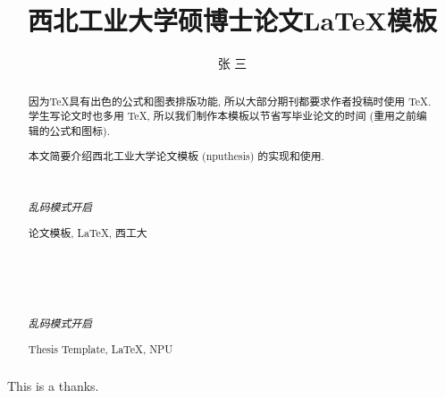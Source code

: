 \documentclass[twoside,UTF8,phd]{nputhesis}
\title[\LaTeX\ Template for Thesis of NPU]{西北工业大学硕博士论文\LaTeX 模板}
\author[San Zhang]{张\,\,三}
\theoremstyle{plain}
\begin{document}
\makecover  %
\frontmatter

\begin{abstract}  
    因为\TeX 具有出色的公式和图表排版功能, 所以大部分期刊都要求作者投稿时使用
    \TeX. 学生写论文时也多用 \TeX, 所以我们制作本模板以节省写毕业论文的时间 
    (重用之前编辑的公式和图标).

    本文简要介绍西北工业大学论文模板 (nputhesis) 的实现和使用.

    { %
        \noindent\hrulefill\\
        {\centerline {\it 乱码模式开启}}
        \noindent\hrulefill
    }
    \begin{keywords}
        论文模板, \LaTeX, 西工大 
    \end{keywords}
\end{abstract}

\begin{Abstract}
    { %
        \noindent\hrulefill\\
        {\centerline {\it 乱码模式开启}}
        \noindent\hrulefill
    }
    \begin{Keywords}
        Thesis Template, \LaTeX, NPU
    \end{Keywords}
\end{Abstract}

\tableofcontents 

\mainmatter  %


\appendix
\renewcommand\theequation{\Alph{chapter}-\arabic{equation}}



\backmatter
\begin{spacing}{1}  %


\end{spacing} 

\Thanks
This is a thanks.

\Work

\statement
\end{document}
